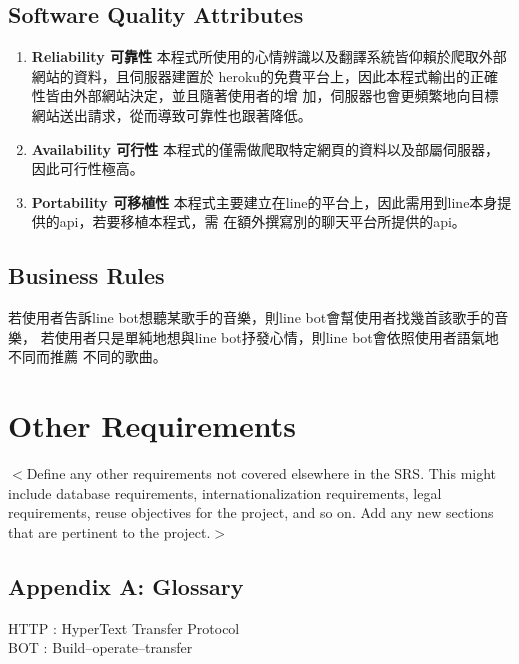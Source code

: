 \documentclass{scrreprt}
\begin{document}
\section{Software Quality Attributes}
\begin{CJK}{UTF8}{<font>}
    \begin{enumerate} 
    \item \textbf {Reliability 可靠性} \newline
    本程式所使用的心情辨識以及翻譯系統皆仰賴於爬取外部網站的資料，且伺服器建置於
    heroku的免費平台上，因此本程式輸出的正確性皆由外部網站決定，並且隨著使用者的增
    加，伺服器也會更頻繁地向目標網站送出請求，從而導致可靠性也跟著降低。
    \item \textbf {Availability 可行性} \newline
    本程式的僅需做爬取特定網頁的資料以及部屬伺服器，因此可行性極高。
    \item \textbf {Portability 可移植性} \newline
    本程式主要建立在line的平台上，因此需用到line本身提供的api，若要移植本程式，需
    在額外撰寫別的聊天平台所提供的api。
    \end{enumerate}
\end{CJK}

\section{Business Rules}
\begin{CJK}{UTF8}{<font>}
若使用者告訴line bot想聽某歌手的音樂，則line bot會幫使用者找幾首該歌手的音樂，
若使用者只是單純地想與line bot抒發心情，則line bot會依照使用者語氣地不同而推薦
不同的歌曲。
\end{CJK}


\chapter{Other Requirements}
\begin{CJK}{UTF8}{<font>}
$<$Define any other requirements not covered elsewhere in the SRS. This might 
include database requirements, internationalization requirements, legal 
requirements, reuse objectives for the project, and so on. Add any new sections 
that are pertinent to the project.$>$
\end{CJK}

\section{Appendix A: Glossary}
\begin{CJK}{UTF8}{<font>}
HTTP : HyperText Transfer Protocol\\
BOT : Build–operate–transfer
\end{CJK}
\end{document}
